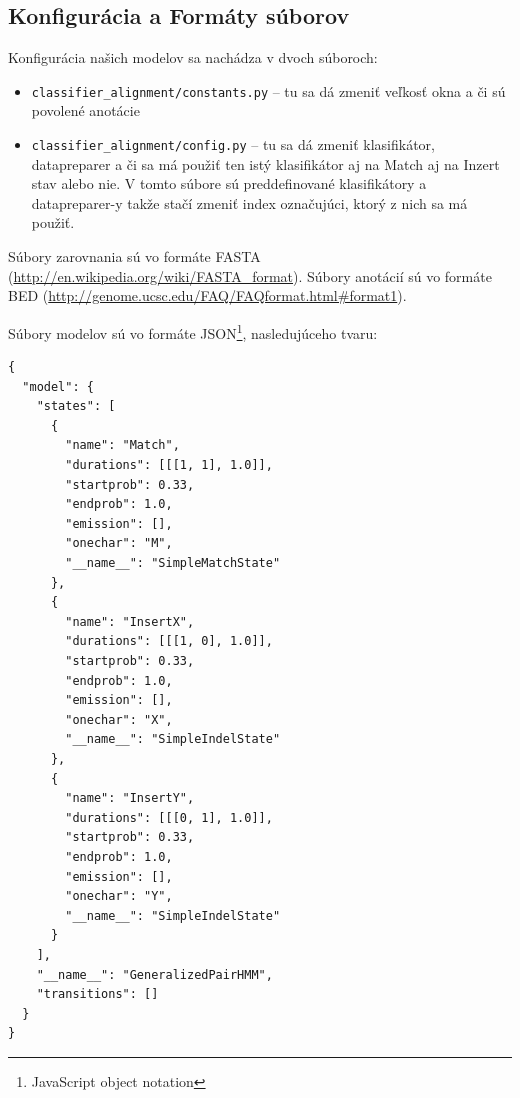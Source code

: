 \subsection{Konfigurácia a Formáty súborov}
Konfigurácia našich modelov sa nachádza v dvoch súboroch:
\begin{itemize}
    \item {\tt classifier\_alignment/constants.py} -- tu sa dá zmeniť veľkosť okna a či sú povolené anotácie
    \item {\tt classifier\_alignment/config.py} -- tu sa dá zmeniť klasifikátor, datapreparer a  či sa má použiť ten istý klasifikátor aj na Match aj na Inzert stav alebo nie. V tomto súbore sú preddefinované klasifikátory a datapreparer-y takže stačí zmeniť index označujúci, ktorý z nich sa má použiť.
\end{itemize}

Súbory zarovnania sú vo formáte FASTA (\url{http://en.wikipedia.org/wiki/FASTA_format}). Súbory anotácií sú vo formáte BED (\url{http://genome.ucsc.edu/FAQ/FAQformat.html#format1}).

Súbory modelov sú vo formáte JSON\footnote{JavaScript object notation}, nasledujúceho tvaru:

\begin{lstlisting}
{
  "model": {
    "states": [
      {
        "name": "Match",
        "durations": [[[1, 1], 1.0]],
        "startprob": 0.33,
        "endprob": 1.0,
        "emission": [],
        "onechar": "M",
        "__name__": "SimpleMatchState"
      },
      {
        "name": "InsertX",
        "durations": [[[1, 0], 1.0]],
        "startprob": 0.33,
        "endprob": 1.0,
        "emission": [],
        "onechar": "X",
        "__name__": "SimpleIndelState"
      },
      {
        "name": "InsertY",
        "durations": [[[0, 1], 1.0]],
        "startprob": 0.33,
        "endprob": 1.0,
        "emission": [],
        "onechar": "Y",
        "__name__": "SimpleIndelState"
      }
    ],
    "__name__": "GeneralizedPairHMM",
    "transitions": []
  }
}
\end{lstlisting}


